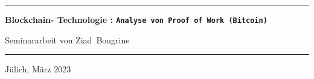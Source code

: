 {\begin{titlepage}
      \vspace{160pt}%
      \rule{\textwidth}{2pt}

      \begin{center}
          \Huge \bfseries Blockchain- Technologie : \texttt{Analyse von Proof of Work (Bitcoin)}

          \vspace{20pt}%
          \Large Seminararbeit von Ziad~Bougrine
      \end{center}

      \rule{\textwidth}{2pt}

      \vspace{15pt}
      \begin{center}
          Jülich, März 2023
      \end{center}

  \end{titlepage}
}
\makeatother

